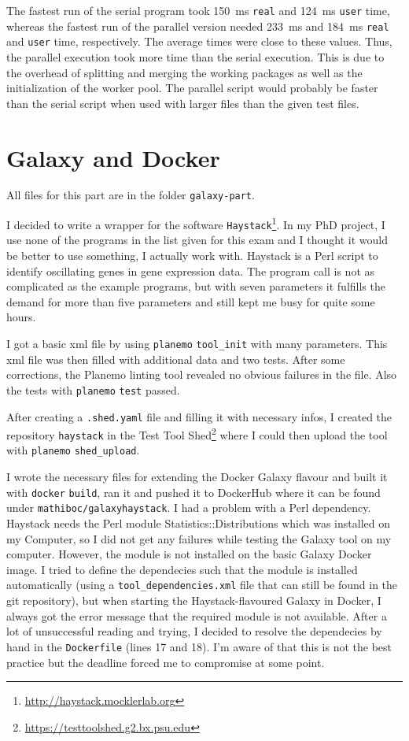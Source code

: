 \documentclass[paper=a4, 12pt]{scrartcl}
\begin{document}
The fastest run of the serial program took 150~ms \texttt{real} and 124~ms \texttt{user} time, whereas the fastest run of the parallel version needed 233~ms and 184~ms \texttt{real} and \texttt{user} time, respectively. The average times were close to these values. Thus, the parallel execution took more time than the serial execution. This is due to the overhead of splitting and merging the working packages as well as the initialization of the worker pool. The parallel script would probably be faster than the serial script when used with larger files than the given test files.

\section{Galaxy and Docker}

All files for this part are in the folder \texttt{galaxy-part}.

I decided to write a wrapper for the software \texttt{Haystack}\footnote{\url{http://haystack.mocklerlab.org}}. In my PhD project, I use none of the programs in the list given for this exam and I thought it would be better to use something, I actually work with. Haystack is a Perl script to identify oscillating genes in gene expression data. The program call is not as complicated as the example programs, but with seven parameters it fulfills the demand for more than five parameters and still kept me busy for quite some hours.

I got a basic xml file by using \texttt{planemo} \texttt{tool\_init} with many parameters. This xml file was then filled with additional data and two tests. After some corrections, the Planemo linting tool revealed no obvious failures in the file. Also the tests with \texttt{planemo} \texttt{test} passed.

After creating a \texttt{.shed.yaml} file and filling it with necessary infos, I created the repository \texttt{haystack} in the Test Tool Shed\footnote{\url{https://testtoolshed.g2.bx.psu.edu}} where I could then upload the tool with \texttt{planemo} \texttt{shed\_upload}.

I wrote the necessary files for extending the Docker Galaxy flavour and built it with \texttt{docker} \texttt{build}, ran it and pushed it to DockerHub where it can be found under \texttt{mathiboc/}\allowbreak\texttt{galaxyhaystack}. I had a problem with a Perl dependency. Haystack needs the Perl module Statistics::Distributions which was installed on my Computer, so I did not get any failures while testing the Galaxy tool on my computer. However, the module is not installed on the basic Galaxy Docker image. I tried to define the dependecies such that the module is installed automatically (using a \texttt{tool\_dependencies.xml} file that can still be found in the git repository), but when starting the Haystack-flavoured Galaxy in Docker, I always got the error message that the required module is not available. After a lot of unsuccessful reading and trying, I decided to resolve the dependecies by hand in the \texttt{Dockerfile} (lines 17 and 18). I'm aware of that this is not the best practice but the deadline forced me to compromise at some point.
\end{document}

